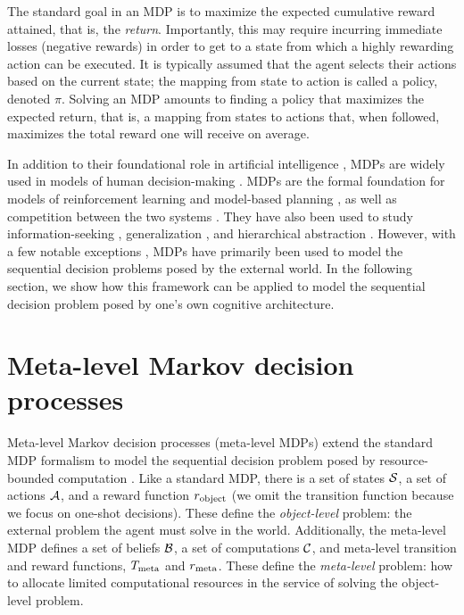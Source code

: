 The standard goal in an MDP is to maximize the expected cumulative reward attained, that is, the \emph{return}. Importantly, this may require incurring immediate losses (negative rewards) in order to get to a state from which a highly rewarding action can be executed. It is typically assumed that the agent selects their actions based on the current state; the mapping from state to action is called a policy, denoted $\pi$. Solving an MDP amounts to finding a policy that maximizes the expected return, that is, a mapping from states to actions that, when followed, maximizes the total reward one will receive on average.


In addition to their foundational role in artificial intelligence \citep{sutton2018reinforcement}, MDPs are widely used in models of human decision-making \citep{dayan2008decision}. MDPs are the formal foundation for models of reinforcement learning \citep{niv2009reinforcement} and model-based planning \citep{huys2015interplay,botvinick2012planning}, as well as competition between the two systems \citep{daw2005uncertaintybased,keramati2011speed,kool2017costbenefit}. They have also been used to study information-seeking \citep{gottlieb2013informationseeking,hunt2016approachinduced}, generalization \citep{tomov2021multitask}, and hierarchical abstraction \citep{solway2014optimal,botvinick2009hierarchically}. However, with a few notable exceptions \citep{dayan2008serotonin,drugowitsch2012cost,tajima2016optimal}, MDPs have primarily been used to model the sequential decision problems posed by the external world. In the following section, we show how this framework can be applied to model the sequential decision problem posed by one's own cognitive architecture.

\section{Meta-level Markov decision processes}


Meta-level Markov decision processes (meta-level MDPs) extend the standard MDP formalism to model the sequential decision problem posed by resource-bounded computation \citep{hay2012selecting}. Like a standard MDP, there is a set of states $\S$, a set of actions $\A$, and a reward function $r\object$ (we omit the transition function because we focus on one-shot decisions). These define the \emph{object-level} problem: the external problem the agent must solve in the world. Additionally, the meta-level MDP defines a set of beliefs $\B$, a set of computations $\C$, and meta-level transition and reward functions, $T\meta$ and $r\meta$. These define the \emph{meta-level} problem: how to allocate limited computational resources in the service of solving the object-level problem.

